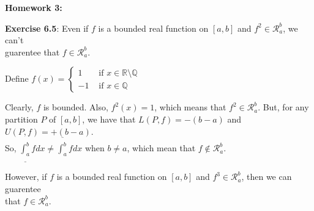 \documentclass{book}
\newcommand{\pracTwo}{
   \color{Orange}%
   \fontsize{12}{14}\selectfont%
}
\newenvironment{myIndent}{%
   \begin{adjustwidth}{2.5em}{0em}%
}{%
   \end{adjustwidth}%
}
\newcommand*{\markHW}[1]{%
   {\huge \color{Black} \textbf{#1} \newline}%
}
\newcommand{\retTwo}{\hfill\bigbreak}
\begin{document}
\newpage

\markHW{Homework 3:}

\textbf{Exercise 6.5}: Even if $f$ is a bounded real function on $[a, b]$ and $f^2 \in \mathscr{R}_a^b$, we can't\\ guarentee that $f \in \mathscr{R}_a^b$.\\ [-6pt]

{\begin{myIndent}\pracTwo
   Define $f(x) = \left\{
   \begin{matrix}
      1 & \text{ if } x \in \mathbb{R} \setminus \mathbb{Q} \\
      -1 & \text{ if } x \in \mathbb{Q}\phantom{\mathbb{R}\setminus .}
   \end{matrix}\right.$\retTwo

   Clearly, $f$ is bounded. Also, $f^2(x) = 1$, which means that $f^2 \in \mathscr{R}_a^b$. But, for any\\ [2pt] partition $P$ of $[a, b]$, we have that $L(P, f) = -(b - a)$ and $U(P, f) = +(b - a)$.\\ So, $\underline{\int_a^b}fdx \neq \overline{\int_a^b}fdx$ when $b \neq a$, which mean that $f \notin \mathscr{R}_a^b$.
   \retTwo
\end{myIndent}}

However, if $f$ is a bounded real function on $[a, b]$ and $f^3 \in \mathscr{R}_a^b$, then we can guarentee\\ that $f \in \mathscr{R}_a^b$.
\end{document}
